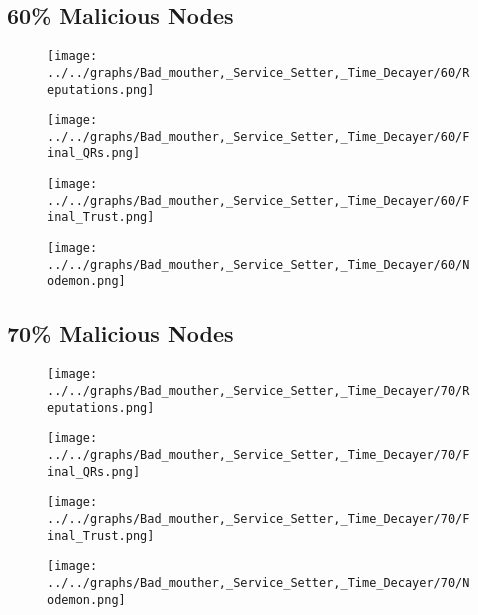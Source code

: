 \begin{minipage}[t]{0.49\columnwidth}
\subsection*{60\% Malicious Nodes}
    \begin{figure}[H]
        \centering
        \texttt{[image: ../../graphs/Bad\_mouther,\_Service\_Setter,\_Time\_Decayer/60/Reputations.png]}
    \end{figure}
    \begin{figure}[H]
        \centering
        \texttt{[image: ../../graphs/Bad\_mouther,\_Service\_Setter,\_Time\_Decayer/60/Final\_QRs.png]}
    \end{figure}
\end{minipage}
\begin{minipage}[t]{0.49\columnwidth}
    \begin{figure}[H]
        \centering
        \texttt{[image: ../../graphs/Bad\_mouther,\_Service\_Setter,\_Time\_Decayer/60/Final\_Trust.png]}
    \end{figure}
    \begin{figure}[H]
        \centering
        \texttt{[image: ../../graphs/Bad\_mouther,\_Service\_Setter,\_Time\_Decayer/60/Nodemon.png]}
    \end{figure}
\end{minipage}

\begin{minipage}[t]{0.49\columnwidth}
\subsection*{70\% Malicious Nodes}
    \begin{figure}[H]
        \centering
        \texttt{[image: ../../graphs/Bad\_mouther,\_Service\_Setter,\_Time\_Decayer/70/Reputations.png]}
    \end{figure}
    \begin{figure}[H]
        \centering
        \texttt{[image: ../../graphs/Bad\_mouther,\_Service\_Setter,\_Time\_Decayer/70/Final\_QRs.png]}
    \end{figure}
\end{minipage}
\begin{minipage}[t]{0.49\columnwidth}
    \begin{figure}[H]
        \centering
        \texttt{[image: ../../graphs/Bad\_mouther,\_Service\_Setter,\_Time\_Decayer/70/Final\_Trust.png]}
    \end{figure}
    \begin{figure}[H]
        \centering
        \texttt{[image: ../../graphs/Bad\_mouther,\_Service\_Setter,\_Time\_Decayer/70/Nodemon.png]}
    \end{figure}
\end{minipage}

